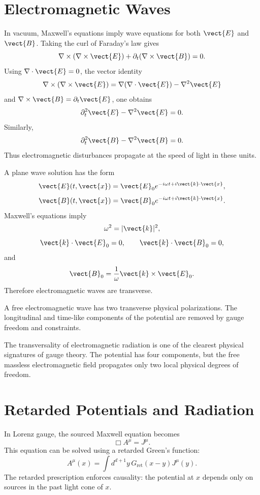 \section{Electromagnetic Waves}

In vacuum, Maxwell's equations imply wave equations for both \(\vect{E}\) and
\(\vect{B}\). Taking the curl of Faraday's law gives
\[
    \nabla\times(\nabla\times\vect{E})
    +\partial_t(\nabla\times\vect{B})=0.
\]
Using \(\nabla\cdot\vect{E}=0\), the vector identity
\[
    \nabla\times(\nabla\times\vect{E})
    =\nabla(\nabla\cdot\vect{E})-\nabla^2\vect{E}
\]
and \(\nabla\times\vect{B}=\partial_t\vect{E}\), one obtains
\[
    \partial_t^2\vect{E}-\nabla^2\vect{E}=0.
\]
Similarly,
\[
    \partial_t^2\vect{B}-\nabla^2\vect{B}=0.
\]
Thus electromagnetic disturbances propagate at the speed of light in these
units.

A plane wave solution has the form
\[
    \vect{E}(t,\vect{x})=\vect{E}_0 e^{-i\omega t+i\vect{k}\cdot\vect{x}},
\]
\[
    \vect{B}(t,\vect{x})=\vect{B}_0 e^{-i\omega t+i\vect{k}\cdot\vect{x}}.
\]
Maxwell's equations imply
\[
    \omega^2=|\vect{k}|^2,
\]
\[
    \vect{k}\cdot\vect{E}_0=0,
    \qquad
    \vect{k}\cdot\vect{B}_0=0,
\]
and
\[
    \vect{B}_0=\frac{1}{\omega}\vect{k}\times\vect{E}_0.
\]
Therefore electromagnetic waves are transverse.

\begin{definitionbox}
A free electromagnetic wave has two transverse physical polarizations. The
longitudinal and time-like components of the potential are removed by gauge
freedom and constraints.
\end{definitionbox}

The transversality of electromagnetic radiation is one of the clearest physical
signatures of gauge theory. The potential has four components, but the free
massless electromagnetic field propagates only two local physical degrees of
freedom.

\section{Retarded Potentials and Radiation}

In Lorenz gauge, the sourced Maxwell equation becomes
\[
    \Box A^\mu=J^\mu.
\]
This equation can be solved using a retarded Green's function:
\[
    A^\mu(x)=\int d^{d+1}y\,G_{\mathrm{ret}}(x-y)J^\mu(y).
\]
The retarded prescription enforces causality: the potential at \(x\) depends
only on sources in the past light cone of \(x\).

